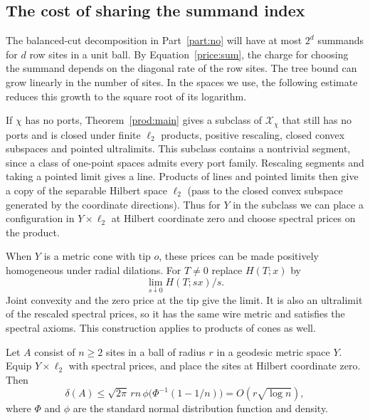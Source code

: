 \subsection{The cost of sharing the summand index}

The balanced-cut decomposition in Part~\ref{part:no} will have at most
$2^d$ summands for $d$ row sites in a unit ball. By
Equation~\eqref{price:sum}, the charge for choosing the summand
depends on the diagonal rate of the row sites. The tree bound can grow
linearly in the number of sites. In the spaces we use, the following
estimate reduces this growth to the square root of its logarithm.

If $\chi$ has no ports, Theorem~\ref{prod:main} gives a subclass of
$\mathcal X_\chi$ that still has no ports and is closed under finite
$\ell_2$ products, positive rescaling, closed convex subspaces and
pointed ultralimits. This subclass contains a nontrivial segment,
since a class of one-point spaces admits every port family. Rescaling
segments and taking a pointed limit gives a line. Products of lines
and pointed limits then give a copy of the separable Hilbert space
$\ell_2$ (pass to the closed convex subspace generated by the
coordinate directions). Thus for $Y$ in the subclass we can place a
configuration in $Y\times\ell_2$ at Hilbert coordinate zero and choose
spectral prices on the product.

When $Y$ is a metric cone with tip $o$, these prices can be made
positively homogeneous under radial dilations. For $T\ne0$ replace
$H(T;x)$ by
\[
       \lim_{s\downarrow0} H(T;s x)/s .
\]
Joint convexity and the zero price at the tip give the limit. It is
also an ultralimit of the rescaled spectral prices, so it has the
same wire metric and satisfies the spectral axioms. This construction
applies to products of cones as well.

\begin{lemma}\label{price:diagonal}
Let $A$ consist of $n\ge2$ sites in a ball of radius $r$ in a geodesic
metric space $Y$. Equip $Y\times\ell_2$ with spectral prices, and
place the sites at Hilbert coordinate zero. Then
\[
  \delta(A)\leq \sqrt{2\pi}\,r n\,
  \phi\bigl(\Phi^{-1}(1-1/n)\bigr)=O(r\sqrt{\log n}),
\]
where $\Phi$ and $\phi$ are the standard normal distribution function
and density.
\end{lemma}

